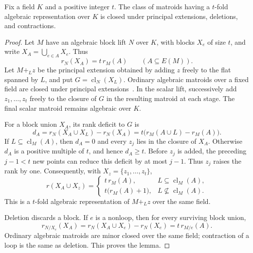\documentclass[11pt]{article}
\theoremstyle{definition}
\newcommand{\cl}{\operatorname{cl}}
\begin{document}
\begin{lemma}\label{lem:principal-fixed}
Fix a field $K$ and a positive integer $t$.  The class of matroids having a $t$-fold algebraic representation over $K$ is closed under principal extensions, deletions, and contractions.
\end{lemma}
\begin{proof}
Let $M$ have an algebraic block lift $N$ over $K$, with blocks $X_e$ of size $t$, and write $X_A=\bigcup_{e\in A}X_e$.  Thus
\[
r_N(X_A)=t\,r_M(A)
\qquad(A\subseteq E(M)).
\]
Let $M+_L z$ be the principal extension obtained by adding $z$ freely to the flat spanned by $L$, and put $G=\cl_N(X_L)$.  Ordinary algebraic matroids over a fixed field are closed under principal extensions~\cite[Lemma~13]{Matus2018}.  In the scalar lift, successively add $z_1,\ldots,z_t$ freely to the closure of $G$ in the resulting matroid at each stage.  The final scalar matroid remains algebraic over $K$.

For a block union $X_A$, its rank deficit to $G$ is
\[
d_A=r_N(X_A\cup X_L)-r_N(X_A)
=t\bigl(r_M(A\cup L)-r_M(A)\bigr).
\]
If $L\subseteq\cl_M(A)$, then $d_A=0$ and every $z_j$ lies in the closure of $X_A$.  Otherwise $d_A$ is a positive multiple of $t$, and hence $d_A\ge t$.  Before $z_j$ is added, the preceding $j-1<t$ new points can reduce this deficit by at most $j-1$.  Thus $z_j$ raises the rank by one.  Consequently, with $X_z=\{z_1,\ldots,z_t\}$,
\[
r(X_A\cup X_z)=
\begin{cases}
t\,r_M(A),&L\subseteq\cl_M(A),\\
t\bigl(r_M(A)+1\bigr),&L\nsubseteq\cl_M(A).
\end{cases}
\]
This is a $t$-fold algebraic representation of $M+_L z$ over the same field.

Deletion discards a block.  If $e$ is a nonloop, then for every surviving block union,
\[
r_{N/X_e}(X_A)
=r_N(X_A\cup X_e)-r_N(X_e)
=t\,r_{M/e}(A).
\]
Ordinary algebraic matroids are minor closed over the same field; contraction of a loop is the same as deletion.  This proves the lemma.
\end{proof}
\end{document}
